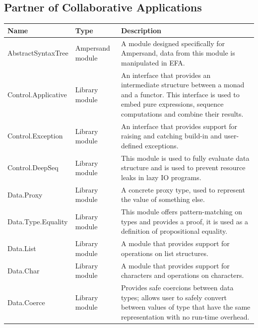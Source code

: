 \documentclass[12pt]{report}
\begin{document}

\subsection{Partner of Collaborative Applications}

\begin{longtable}{ |m{4.5cm}|m{1.5cm}|m{7cm}|  }
    \hline 
    \textbf{Name} & \textbf{Type} & \textbf{Description} \\ \hline \hline
    AbstractSyntaxTree & Ampersand module & A module designed specifically for 
    Ampersand, data from this module is manipulated in EFA.
    \\ \hline        
    Control.Applicative & Library module & An interface that provides an 
    intermediate structure between a monad and a functor. This interface is 
    used to embed pure expressions, sequence computations and combine their 
    results.  \\ \hline
    Control.Exception & Library module & An interface that provides support for 
    raising and catching build-in and user-defined exceptions.  \\ \hline
    Control.DeepSeq & Library module & This module is used to fully evaluate 
    data structure and is used to prevent resource leaks in lazy IO programs.  
    \\ \hline            
    Data.Proxy & Library module & A concrete proxy type, used to represent the 
    value of something else.  \\ \hline    
    Data.Type.Equality & Library module & This module offers pattern-matching 
    on types and provides a proof, it is used as a definition of propositional 
    equality.  \\ \hline        
    Data.List & Library module & A module that provides support for operations 
    on list structures.  \\ \hline
    Data.Char & Library module & A module that provides support for characters 
    and operations on characters.  \\ \hline
    Data.Coerce & Library module & Provides safe coercions between data types; 
    allows user to safely convert between values of type that have the same 
    representation with no run-time overhead.   \\ \hline

\end{longtable}
\end{document}
